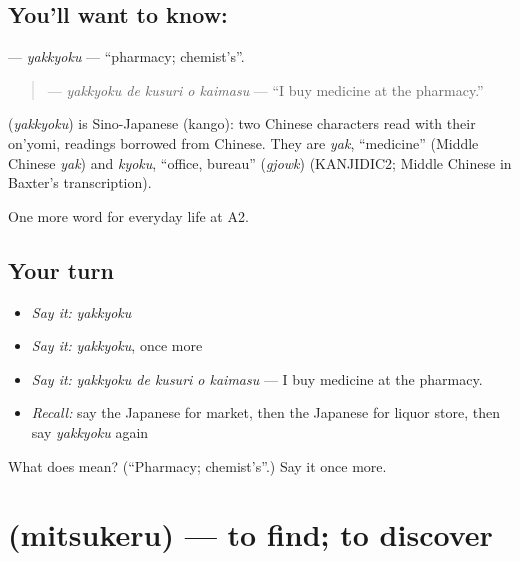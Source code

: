 \subsection*{You'll want to know: }
\textbf{} — \emph{yakkyoku} — \textquotedblleft{}pharmacy; chemist's\textquotedblright{}.

\begin{quote}
\textbf{  } — \emph{yakkyoku de kusuri o kaimasu} — \textquotedblleft{}I buy medicine at the pharmacy.\textquotedblright{}
\end{quote}

\begin{cousinweb}
\textbf{} (\emph{yakkyoku}) is Sino-Japanese (kango): two Chinese characters read with their on'yomi, readings borrowed from Chinese. They are \emph{yak}, \textquotedblleft{}medicine\textquotedblright{} (Middle Chinese \emph{yak}) and \emph{kyoku}, \textquotedblleft{}office, bureau\textquotedblright{} (\emph{gjowk}) (KANJIDIC2; Middle Chinese in Baxter's transcription).
\end{cousinweb}

\begin{grammarlens}[title={What you've built}]
One more word for everyday life at A2.
\end{grammarlens}

\subsection*{Your turn}
\begin{itemize}
\raggedright
  \item \emph{Say it:} \emph{yakkyoku}
  \item \emph{Say it:} \emph{yakkyoku}, once more
  \item \emph{Say it:} \emph{yakkyoku de kusuri o kaimasu} — I buy medicine at the pharmacy.
  \item \emph{Recall:} say the Japanese for market, then the Japanese for liquor store, then say \emph{yakkyoku} again
\end{itemize}

\begin{tcolorbox}[breakable,colback=teal!4,colframe=teal!35!black,title={Before you move on}]
What does  mean? (\textquotedblleft{}Pharmacy; chemist's\textquotedblright{}.) Say it once more.
\end{tcolorbox}
\section[\texorpdfstring{\ja{みつける} (mitsukeru)}{みつける (mitsukeru)}]{ (mitsukeru) — to find; to discover}

